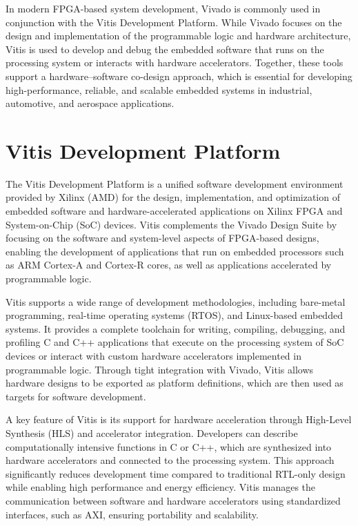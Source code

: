In modern FPGA-based system development, Vivado is commonly used in conjunction with the Vitis Development Platform. While Vivado focuses on the design and implementation of the programmable logic and hardware architecture, Vitis is used to develop and debug the embedded software that runs on the processing system or interacts with hardware accelerators. Together, these tools support a hardware–software co-design approach, which is essential for developing high-performance, reliable, and scalable embedded systems in industrial, automotive, and aerospace applications.

\section{Vitis Development Platform}
The Vitis Development Platform is a unified software development environment provided by Xilinx (AMD) for the design, implementation, and optimization of embedded software and hardware-accelerated applications on Xilinx FPGA and System-on-Chip (SoC) devices. Vitis complements the Vivado Design Suite by focusing on the software and system-level aspects of FPGA-based designs, enabling the development of applications that run on embedded processors such as ARM Cortex-A and Cortex-R cores, as well as applications accelerated by programmable logic.

Vitis supports a wide range of development methodologies, including bare-metal programming, real-time operating systems (RTOS), and Linux-based embedded systems. It provides a complete toolchain for writing, compiling, debugging, and profiling C and C++ applications that execute on the processing system of SoC devices or interact with custom hardware accelerators implemented in programmable logic. Through tight integration with Vivado, Vitis allows hardware designs to be exported as platform definitions, which are then used as targets for software development.

A key feature of Vitis is its support for hardware acceleration through High-Level Synthesis (HLS) and accelerator integration. Developers can describe computationally intensive functions in C or C++, which are synthesized into hardware accelerators and connected to the processing system. This approach significantly reduces development time compared to traditional RTL-only design while enabling high performance and energy efficiency. Vitis manages the communication between software and hardware accelerators using standardized interfaces, such as AXI, ensuring portability and scalability.

